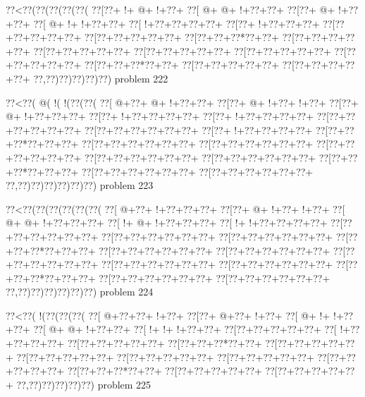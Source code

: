 \vbox{\vbox{\goo
\0??<\0??(\0??(\0??(\0??(\0??(
\0??[\0??+\- !+\- @+\- !+\0??+
\0??[\- @+\- @+\- !+\0??+\0??+
\0??[\0??+\- @+\- !+\0??+\0??+
\0??[\- @+\- !+\- !+\0??+\0??+
\0??[\- !+\0??+\0??+\0??+\0??+
\0??[\0??+\- !+\0??+\0??+\0??+
\0??[\0??+\0??+\0??+\0??+\0??+
\0??[\0??+\0??+\0??+\0??+\0??+
\0??[\0??+\0??+\0??*\0??+\0??+
\0??[\0??+\0??+\0??+\0??+\0??+
\0??[\0??+\0??+\0??+\0??+\0??+
\0??[\0??+\0??+\0??+\0??+\0??+
\0??[\0??+\0??+\0??+\0??+\0??+
\0??[\0??+\0??+\0??+\0??+\0??+
\0??[\0??+\0??+\0??*\0??+\0??+
\0??[\0??+\0??+\0??+\0??+\0??+
\0??[\0??+\0??+\0??+\0??+\0??+
\0??,\0??)\0??)\0??)\0??)\0??)
}
\hfil problem 222\hfil\break
}

\vbox{\vbox{\goo
\0??<\0??(\- @(\- !(\- !(\0??(\0??(
\0??[\- @+\0??+\- @+\- !+\0??+\0??+
\0??[\0??+\- @+\- !+\0??+\- !+\0??+
\0??[\0??+\- @+\- !+\0??+\0??+\0??+
\0??[\0??+\- !+\0??+\0??+\0??+\0??+
\0??[\0??+\- !+\0??+\0??+\0??+\0??+
\0??[\0??+\0??+\0??+\0??+\0??+\0??+
\0??[\0??+\0??+\0??+\0??+\0??+\0??+
\0??[\0??+\- !+\0??+\0??+\0??+\0??+
\0??[\0??+\0??+\0??*\0??+\0??+\0??+
\0??[\0??+\0??+\0??+\0??+\0??+\0??+
\0??[\0??+\0??+\0??+\0??+\0??+\0??+
\0??[\0??+\0??+\0??+\0??+\0??+\0??+
\0??[\0??+\0??+\0??+\0??+\0??+\0??+
\0??[\0??+\0??+\0??+\0??+\0??+\0??+
\0??[\0??+\0??+\0??*\0??+\0??+\0??+
\0??[\0??+\0??+\0??+\0??+\0??+\0??+
\0??[\0??+\0??+\0??+\0??+\0??+\0??+
\0??,\0??)\0??)\0??)\0??)\0??)\0??)
}
\hfil problem 223\hfil\break
}

\vbox{\vbox{\goo
\0??<\0??(\0??(\0??(\0??(\0??(\0??(
\0??[\- @+\0??+\- !+\0??+\0??+\0??+
\0??[\0??+\- @+\- !+\0??+\- !+\0??+
\0??[\- @+\- @+\- !+\0??+\0??+\0??+
\0??[\- !+\- @+\- !+\0??+\0??+\0??+
\0??[\- !+\- !+\0??+\0??+\0??+\0??+
\0??[\0??+\0??+\0??+\0??+\0??+\0??+
\0??[\0??+\0??+\0??+\0??+\0??+\0??+
\0??[\0??+\0??+\0??+\0??+\0??+\0??+
\0??[\0??+\0??+\0??*\0??+\0??+\0??+
\0??[\0??+\0??+\0??+\0??+\0??+\0??+
\0??[\0??+\0??+\0??+\0??+\0??+\0??+
\0??[\0??+\0??+\0??+\0??+\0??+\0??+
\0??[\0??+\0??+\0??+\0??+\0??+\0??+
\0??[\0??+\0??+\0??+\0??+\0??+\0??+
\0??[\0??+\0??+\0??*\0??+\0??+\0??+
\0??[\0??+\0??+\0??+\0??+\0??+\0??+
\0??[\0??+\0??+\0??+\0??+\0??+\0??+
\0??,\0??)\0??)\0??)\0??)\0??)\0??)
}
\hfil problem 224\hfil\break
}

\vbox{\vbox{\goo
\0??<\0??(\- !(\0??(\0??(\0??(
\0??[\- @+\0??+\0??+\- !+\0??+
\0??[\0??+\- @+\0??+\- !+\0??+
\0??[\- @+\- !+\- !+\0??+\0??+
\0??[\- @+\- @+\- !+\0??+\0??+
\0??[\- !+\- !+\- !+\0??+\0??+
\0??[\0??+\0??+\0??+\0??+\0??+
\0??[\- !+\0??+\0??+\0??+\0??+
\0??[\0??+\0??+\0??+\0??+\0??+
\0??[\0??+\0??+\0??*\0??+\0??+
\0??[\0??+\0??+\0??+\0??+\0??+
\0??[\0??+\0??+\0??+\0??+\0??+
\0??[\0??+\0??+\0??+\0??+\0??+
\0??[\0??+\0??+\0??+\0??+\0??+
\0??[\0??+\0??+\0??+\0??+\0??+
\0??[\0??+\0??+\0??*\0??+\0??+
\0??[\0??+\0??+\0??+\0??+\0??+
\0??[\0??+\0??+\0??+\0??+\0??+
\0??,\0??)\0??)\0??)\0??)\0??)
}
\hfil problem 225\hfil\break
}

